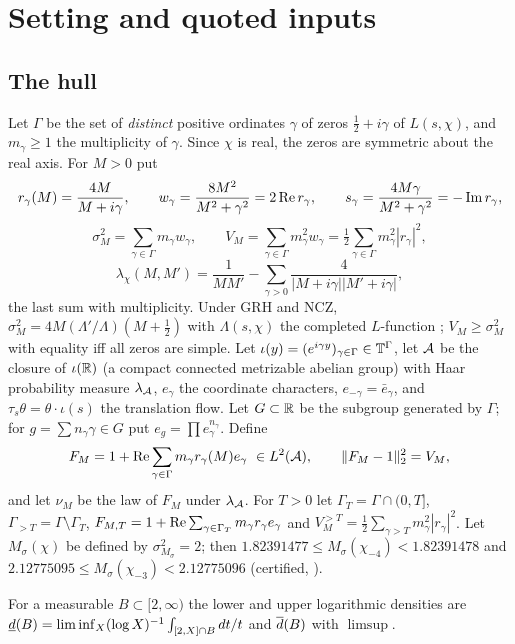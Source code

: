 \section{Setting and quoted inputs}\label{sec:setting}

\subsection{The hull}
Let $\Gamma$ be the set of \emph{distinct} positive ordinates $\gamma$ of zeros $\frac12+i\gamma$ of $L(s,\chi)$, and $m_\gamma\ge1$ the multiplicity of $\gamma$. Since $\chi$ is real, the zeros are symmetric about the real axis. For $M>0$ put
\[
r_\gamma(M)=\frac{4M}{M+i\gamma},\qquad w_\gamma=\frac{8M^2}{M^2+\gamma^2}=2\operatorname{Re} r_\gamma,\qquad s_\gamma=\frac{4M\gamma}{M^2+\gamma^2}=-\operatorname{Im} r_\gamma,
\]
\[
\sigma_M^2=\sum_{\gamma\in\Gamma}m_\gamma w_\gamma,\qquad V_M=\sum_{\gamma\in\Gamma}m_\gamma^2w_\gamma=\tfrac12\sum_{\gamma\in\Gamma}m_\gamma^2|r_\gamma|^2,
\]
\[
\lambda_\chi(M,M')=\frac1{MM'}-\sum_{\gamma>0}\frac4{|M+i\gamma||M'+i\gamma|},
\]
the last sum with multiplicity. Under GRH and NCZ, $\sigma_M^2=4M(\Lambda'/\Lambda)(M+\frac12)$ with $\Lambda(s,\chi)$ the completed $L$-function \cite[\S1.1, (Q2)]{GO}; $V_M\ge\sigma_M^2$ with equality iff all zeros are simple. Let $\iota(y)=(e^{i\gamma y})_{\gamma\in\Gamma}\in\mathbb T^\Gamma$, let $\mathcal A$ be the closure of $\iota(\mathbb R)$ (a compact connected metrizable abelian group) with Haar probability measure $\lambda_{\mathcal A}$, $e_\gamma$ the coordinate characters, $e_{-\gamma}=\bar e_\gamma$, and $\tau_s\theta=\theta\cdot\iota(s)$ the translation flow. Let $G\subset\mathbb R$ be the subgroup generated by $\Gamma$; for $g=\sum n_\gamma\gamma\in G$ put $e_g=\prod e_\gamma^{n_\gamma}$. Define
\[
F_M=1+\operatorname{Re}\sum_{\gamma\in\Gamma}m_\gamma r_\gamma(M)e_\gamma\ \in L^2(\mathcal A),\qquad \|F_M-1\|_2^2=V_M,
\]
and let $\nu_M$ be the law of $F_M$ under $\lambda_{\mathcal A}$. For $T>0$ let $\Gamma_T=\Gamma\cap(0,T]$, $\Gamma_{>T}=\Gamma\setminus\Gamma_T$, $F_{M,T}=1+\operatorname{Re}\sum_{\gamma\in\Gamma_T}m_\gamma r_\gamma e_\gamma$ and $V_M^{>T}=\frac12\sum_{\gamma>T}m_\gamma^2|r_\gamma|^2$. Let $M_\sigma(\chi)$ be defined by $\sigma^2_{M_\sigma}=2$; then $1.82391477\le M_\sigma(\chi_{-4})<1.82391478$ and $2.12775095\le M_\sigma(\chi_{-3})<2.12775096$ (certified, \cite{GO}).

For a measurable $B\subset[2,\infty)$ the lower and upper logarithmic densities are $\underline d(B)=\liminf_X(\log X)^{-1}\int_{[2,X]\cap B}dt/t$ and $\overline d(B)$ with $\limsup$.

